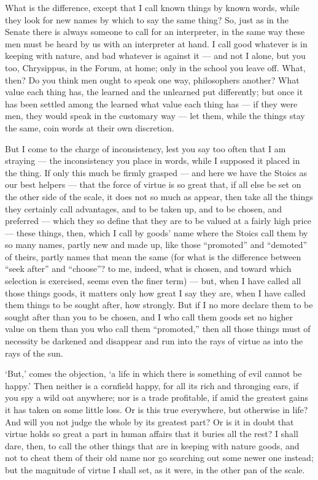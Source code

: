  What is the difference, except that I call known things by known words, while they look for new names by which to say the same thing? So, just as in the Senate there is always someone to call for an interpreter, in the same way these men must be heard by us with an interpreter at hand. I call good whatever is in keeping with nature, and bad whatever is against it — and not I alone, but you too, Chrysippus, in the Forum, at home; only in the school you leave off. What, then? Do you think men ought to speak one way, philosophers another? What value each thing has, the learned and the unlearned put differently; but once it has been settled among the learned what value each thing has — if they were men, they would speak in the customary way — let them, while the things stay the same, coin words at their own discretion.

 But I come to the charge of inconsistency, lest you say too often that I am straying — the inconsistency you place in words, while I supposed it placed in the thing. If only this much be firmly grasped — and here we have the Stoics as our best helpers — that the force of virtue is so great that, if all else be set on the other side of the scale, it does not so much as appear, then take all the things they certainly call advantages, and to be taken up, and to be chosen, and preferred — which they so define that they are to be valued at a fairly high price — these things, then, which I call by goods’ name where the Stoics call them by so many names, partly new and made up, like those “promoted” and “demoted” of theirs, partly names that mean the same (for what is the difference between “seek after” and “choose”? to me, indeed, what is chosen, and toward which selection is exercised, seems even the finer term) — but, when I have called all those things goods, it matters only how great I say they are, when I have called them things to be sought after, how strongly. But if I no more declare them to be sought after than you to be chosen, and I who call them goods set no higher value on them than you who call them “promoted,” then all those things must of necessity be darkened and disappear and run into the rays of virtue as into the rays of the sun.

 ‘But,’ comes the objection, ‘a life in which there is something of evil cannot be happy.’ Then neither is a cornfield happy, for all its rich and thronging ears, if you spy a wild oat anywhere; nor is a trade profitable, if amid the greatest gains it has taken on some little loss. Or is this true everywhere, but otherwise in life? And will you not judge the whole by its greatest part? Or is it in doubt that virtue holds so great a part in human affairs that it buries all the rest? I shall dare, then, to call the other things that are in keeping with nature goods, and not to cheat them of their old name nor go searching out some newer one instead; but the magnitude of virtue I shall set, as it were, in the other pan of the scale.

